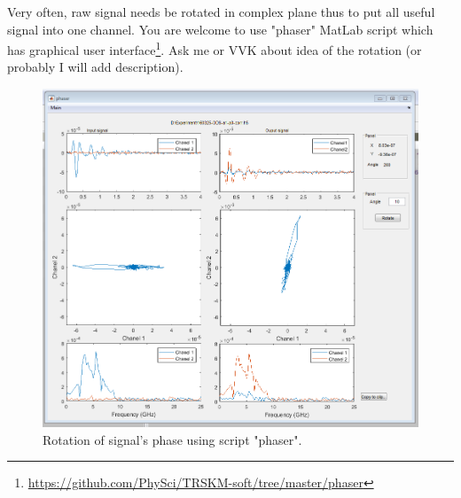\documentclass[14pt,a4paper] {article}
\begin{document}
Very often, raw signal needs be rotated in complex plane thus to put all useful signal into one channel. You are welcome to use "phaser" MatLab script which  has graphical user interface\footnote{\url{https://github.com/PhySci/TRSKM-soft/tree/master/phaser}}. Ask me or VVK about idea of the rotation (or probably I will add description).
 
 \begin{figure}
\includegraphics[width = 0.8\linewidth]{phaser}
\caption{Rotation of signal's phase using script "phaser".}
\end{figure}
  
\end{document}
